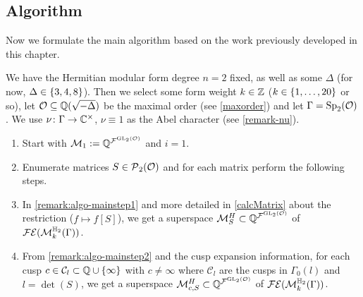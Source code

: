 \subsection{Algorithm}

Now we formulate the main algorithm based on the work previously developed in this chapter.

\begin{algo}
\label{main-algo}
We have the Hermitian modular form degree $n = 2$ fixed, as well as some $\Delta$ (for now, $\Delta \in \Set{3,4,8}$). Then we select some form weight $k \in \mathbb{Z}$ ($k \in \Set{1,\dots,20}$ or so), let $\mathcal{O} \subseteq \mathbb{Q}(\sqrt{-\Delta})$ be the maximal order (see \cref{maxorder}) and let $\Gamma = \operatorname{Sp}_2(\mathcal{O})$. We use $\nu \colon \Gamma \rightarrow \mathbb{C}^\times$, $\nu \equiv 1$ as the Abel character (see \cref{remark-nu}).

\begin{enumerate}
\item
Start with $\mathcal{M}_1 := \mathbb{Q}^{{\mathcal{F}}^{\operatorname{GL}_2(\mathcal{O})}}$ and $i=1$.

\item\label{NextSStep} Enumerate matrices $S \in \operatorname{\mathcal{P}}_2(\mathcal{O})$ and for each matrix perform the following steps.


\item
In \cref{remark:algo-mainstep1} and more detailed in \cref{calcMatrix} about the restriction ($f \mapsto f[S]$), we get a superspace $\mathcal{M}^H_S \subset \mathbb{Q}^{{\mathcal{F}}^{\operatorname{GL}_2(\mathcal{O})}}$ of $\mathcal{FE}(\operatorname{\mathcal{M}}^{\mathbb{H}_{2}}_{k} (\Gamma))$.

\item
From \cref{remark:algo-mainstep2} and the cusp expansion information, for each cusp $c \in \mathcal{C}_l \subset {\Q \cup \Set{\infty}}$ with $c \ne \infty$ where $\mathcal{C}_l$ are the cusps in $\Gamma_0(l)$ and $l = \det(S)$, we get a superspace $\mathcal{M}^H_{c,S} \subset \mathbb{Q}^{{\mathcal{F}}^{\operatorname{GL}_2(\mathcal{O})}}$ of $\mathcal{FE}(\operatorname{\mathcal{M}}^{\mathbb{H}_{2}}_{k} (\Gamma))$.


\end{enumerate}
\end{algo}
